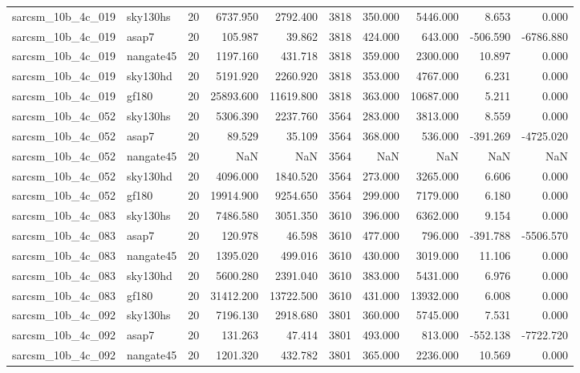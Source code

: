 \documentclass{article}
\begin{document}
\begin{longtable}{llrrrrrrrr}
sarcsm\_10b\_4c\_019 & sky130hs & 20 & 6737.950 & 2792.400 & 3818 & 350.000 & 5446.000 & 8.653 & 0.000 \\
sarcsm\_10b\_4c\_019 & asap7 & 20 & 105.987 & 39.862 & 3818 & 424.000 & 643.000 & -506.590 & -6786.880 \\
sarcsm\_10b\_4c\_019 & nangate45 & 20 & 1197.160 & 431.718 & 3818 & 359.000 & 2300.000 & 10.897 & 0.000 \\
sarcsm\_10b\_4c\_019 & sky130hd & 20 & 5191.920 & 2260.920 & 3818 & 353.000 & 4767.000 & 6.231 & 0.000 \\
sarcsm\_10b\_4c\_019 & gf180 & 20 & 25893.600 & 11619.800 & 3818 & 363.000 & 10687.000 & 5.211 & 0.000 \\
sarcsm\_10b\_4c\_052 & sky130hs & 20 & 5306.390 & 2237.760 & 3564 & 283.000 & 3813.000 & 8.559 & 0.000 \\
sarcsm\_10b\_4c\_052 & asap7 & 20 & 89.529 & 35.109 & 3564 & 368.000 & 536.000 & -391.269 & -4725.020 \\
sarcsm\_10b\_4c\_052 & nangate45 & 20 & NaN & NaN & 3564 & NaN & NaN & NaN & NaN \\
sarcsm\_10b\_4c\_052 & sky130hd & 20 & 4096.000 & 1840.520 & 3564 & 273.000 & 3265.000 & 6.606 & 0.000 \\
sarcsm\_10b\_4c\_052 & gf180 & 20 & 19914.900 & 9254.650 & 3564 & 299.000 & 7179.000 & 6.180 & 0.000 \\
sarcsm\_10b\_4c\_083 & sky130hs & 20 & 7486.580 & 3051.350 & 3610 & 396.000 & 6362.000 & 9.154 & 0.000 \\
sarcsm\_10b\_4c\_083 & asap7 & 20 & 120.978 & 46.598 & 3610 & 477.000 & 796.000 & -391.788 & -5506.570 \\
sarcsm\_10b\_4c\_083 & nangate45 & 20 & 1395.020 & 499.016 & 3610 & 430.000 & 3019.000 & 11.106 & 0.000 \\
sarcsm\_10b\_4c\_083 & sky130hd & 20 & 5600.280 & 2391.040 & 3610 & 383.000 & 5431.000 & 6.976 & 0.000 \\
sarcsm\_10b\_4c\_083 & gf180 & 20 & 31412.200 & 13722.500 & 3610 & 431.000 & 13932.000 & 6.008 & 0.000 \\
sarcsm\_10b\_4c\_092 & sky130hs & 20 & 7196.130 & 2918.680 & 3801 & 360.000 & 5745.000 & 7.531 & 0.000 \\
sarcsm\_10b\_4c\_092 & asap7 & 20 & 131.263 & 47.414 & 3801 & 493.000 & 813.000 & -552.138 & -7722.720 \\
sarcsm\_10b\_4c\_092 & nangate45 & 20 & 1201.320 & 432.782 & 3801 & 365.000 & 2236.000 & 10.569 & 0.000 \\

\end{longtable}
\end{document}
